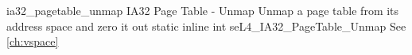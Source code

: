 %
%
%
%

\apidoc
{ia32_pagetable_unmap}
{IA32 Page Table - Unmap}
{Unmap a page table from its address space and zero it out}
{static inline int seL4\_IA32\_PageTable\_Unmap}
{
}
{\errorenumdesc}
{See \autoref{ch:vspace}}
